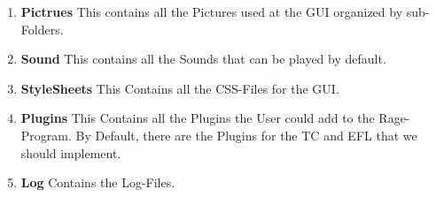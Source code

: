 \documentclass{article}
\begin{document}
\begin{enumerate}
{\begin{enumerate}[*]
			\item{
				\textbf{Pictrues} \newline
				This contains all the Pictures used at the GUI organized by sub-Folders.
			}
			\item{
				\textbf{Sound} \newline
				This contains all the Sounds that can be played by default.
			}
			\item{
				\textbf{StyleSheets} \newline
				This Contains all the CSS-Files for the GUI.
			}
			\item{
				\textbf{Plugins} \newline
				This Contains all the Plugins the User could add to the Rage-Program.
				By Default, there are the Plugins for the TC and EFL that we should implement.
			}
			\item{
				\textbf{Log} \newline
				Contains the Log-Files.
			}
		\end{enumerate}
	}
	\end{enumerate}
	
	\newpage
	\printglossaries
		
\end{document}
